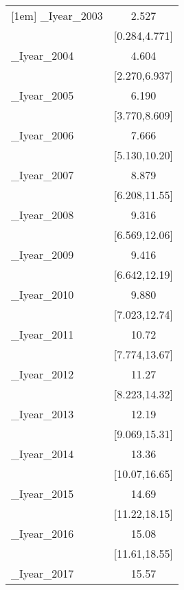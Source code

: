 {\begin{tabular}{l*{1}{c}}
[1em]
\_Iyear\_2003 &                 2.527\sym{*}  \\
            &         [0.284,4.771]         \\
[1em]
\_Iyear\_2004 &                 4.604\sym{***}\\
            &         [2.270,6.937]         \\
[1em]
\_Iyear\_2005 &                 6.190\sym{***}\\
            &         [3.770,8.609]         \\
[1em]
\_Iyear\_2006 &                 7.666\sym{***}\\
            &         [5.130,10.20]         \\
[1em]
\_Iyear\_2007 &                 8.879\sym{***}\\
            &         [6.208,11.55]         \\
[1em]
\_Iyear\_2008 &                 9.316\sym{***}\\
            &         [6.569,12.06]         \\
[1em]
\_Iyear\_2009 &                 9.416\sym{***}\\
            &         [6.642,12.19]         \\
[1em]
\_Iyear\_2010 &                 9.880\sym{***}\\
            &         [7.023,12.74]         \\
[1em]
\_Iyear\_2011 &                 10.72\sym{***}\\
            &         [7.774,13.67]         \\
[1em]
\_Iyear\_2012 &                 11.27\sym{***}\\
            &         [8.223,14.32]         \\
[1em]
\_Iyear\_2013 &                 12.19\sym{***}\\
            &         [9.069,15.31]         \\
[1em]
\_Iyear\_2014 &                 13.36\sym{***}\\
            &         [10.07,16.65]         \\
[1em]
\_Iyear\_2015 &                 14.69\sym{***}\\
            &         [11.22,18.15]         \\
[1em]
\_Iyear\_2016 &                 15.08\sym{***}\\
            &         [11.61,18.55]         \\
[1em]
\_Iyear\_2017 &                 15.57\sym{***}\\

\end{tabular}}
